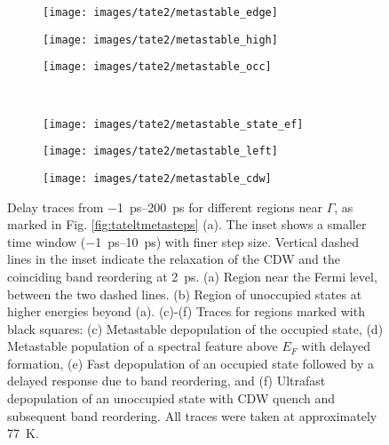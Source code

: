 \begin{figure}[b!]
	\centering
	\begin{subfigure}[b]{0.33\textwidth}
		\texttt{[image: images/tate2/metastable\_edge]}
		\caption{}
	\end{subfigure}
	\begin{subfigure}[b]{0.33\textwidth}
		\texttt{[image: images/tate2/metastable\_high]}
		\caption{}
	\end{subfigure}
	\begin{subfigure}[b]{0.33\textwidth}
		\texttt{[image: images/tate2/metastable\_occ]}
		\caption{}
	\end{subfigure}
	\\
	\begin{subfigure}[b]{0.33\textwidth}
		\texttt{[image: images/tate2/metastable\_state\_ef]}
		\caption{}
	\end{subfigure}
	\begin{subfigure}[b]{0.33\textwidth}
		\texttt{[image: images/tate2/metastable\_left]}
		\caption{}
	\end{subfigure}
	\begin{subfigure}[b]{0.33\textwidth}
		\texttt{[image: images/tate2/metastable\_cdw]}
		\caption{}
	\end{subfigure}
	\caption{Delay traces from \qtyrange{-1}{200}{\pico\second} for different regions near $\Gamma$, as marked in Fig. \ref{fig:tateltmetasteps} (a). The inset shows a smaller time window (\qtyrange{-1}{10}{\pico\second}) with finer step size. Vertical dashed lines in the inset indicate the relaxation of the CDW and the coinciding band reordering at \qty{2}{\pico\second}. (a) Region near the Fermi level, between the two dashed lines. (b) Region of unoccupied states at higher energies beyond (a). (c)-(f) Traces for regions marked with black squares: (c) Metastable depopulation of the occupied state, (d) Metastable population of a spectral feature above $E_F$ with delayed formation, (e) Fast depopulation of an occupied state followed by a delayed response due to band reordering, and (f) Ultrafast depopulation of an unoccupied state with CDW quench and subsequent band reordering. All traces were taken at approximately \qty{77}{\kelvin}.}
	\label{fig:metastableedge}
\end{figure}

